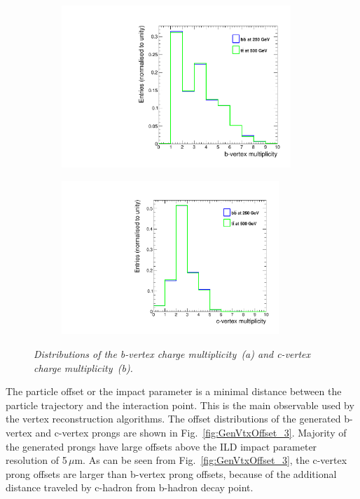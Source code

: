 \begin{figure}[H]
\centering
\begin{subfigure}{0.5\textwidth}
    \includegraphics[width=0.95\textwidth]{ILD/plots/gen-b-vtx.pdf}
\caption{\label{fig:GenVtx_a_3} }
\end{subfigure}%
  \begin{subfigure}{0.5\textwidth}
\centering
    \includegraphics[width=0.9\textwidth]{ILD/plots/gen-c-vtx.pdf}
\caption{\label{fig:GenVtx_b_3} }
\end{subfigure}
    \caption{\sl Distributions of the b-vertex charge multiplicity~(a) and c-vertex charge multiplicity~(b). }
    \label{fig:GenVtx_3}
\end{figure}

The particle offset or the impact parameter is a minimal distance between the particle trajectory and the interaction point. 
This is the main observable used by the vertex reconstruction algorithms. 
The offset distributions of the generated b-vertex and c-vertex prongs are shown in Fig.~\ref{fig:GenVtxOffset_3}.
Majority of the generated prongs have large offsets above the ILD impact parameter resolution of 5\,$\mu$m. 
As can be seen from Fig.~\ref{fig:GenVtxOffset_3}, the c-vertex prong offsets are larger than b-vertex prong offsets, because of the additional distance traveled by c-hadron from b-hadron decay point. 

